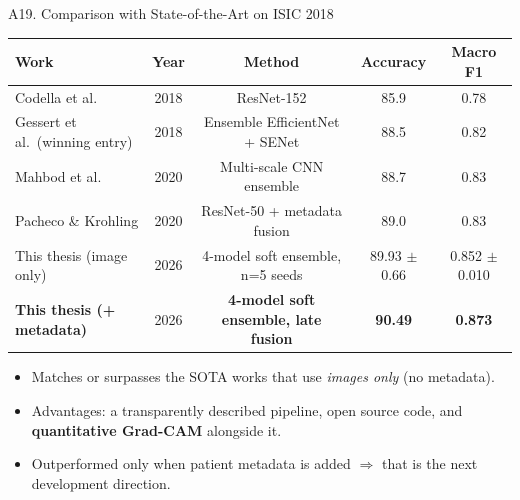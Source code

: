 \documentclass[10pt, aspectratio=169]{beamer}
\begin{document}
\begin{frame}{A19. Comparison with State-of-the-Art on ISIC 2018}
    \scriptsize
    \begin{table}[]
        \centering
        \begin{tabular}{lcccc}
        \toprule
        \rowcolor{usthblue!25} \textbf{Work} & \textbf{Year} & \textbf{Method} & \textbf{Accuracy} & \textbf{Macro F1} \\
        \midrule
        Codella et al.       & 2018 & ResNet-152                  & 85.9 & 0.78 \\
        Gessert et al.\ (winning entry) & 2018 & Ensemble EfficientNet + SENet & 88.5 & 0.82 \\
        Mahbod et al.        & 2020 & Multi-scale CNN ensemble     & 88.7 & 0.83 \\
        Pacheco \& Krohling  & 2020 & ResNet-50 + metadata fusion  & 89.0 & 0.83 \\
        \rowcolor{usthlight}
        This thesis (image only)        & 2026 & 4-model soft ensemble, n=5 seeds & 89.93 $\pm$ 0.66 & 0.852 $\pm$ 0.010 \\
    \rowcolor{usthlight}
    \textbf{This thesis (+ metadata)} & 2026 & \textbf{4-model soft ensemble, late fusion} & \textbf{90.49} & \textbf{0.873} \\
        \bottomrule
        \end{tabular}
    \end{table}

    \vspace{0.3cm}
    \footnotesize
    \begin{itemize}
        \item Matches or surpasses the SOTA works that use \textit{images only} (no metadata).
        \item Advantages: a transparently described pipeline, open source code, and \textbf{quantitative Grad-CAM} alongside it.
        \item Outperformed only when patient metadata is added $\Rightarrow$ that is the next development direction.
    \end{itemize}
\end{frame}
\end{document}
